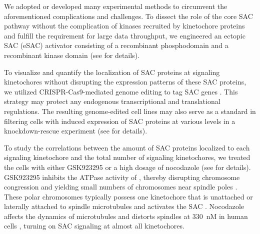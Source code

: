 We adopted or developed many experimental methods to circumvent the aforementioned complications and challenges. To dissect the role of the core SAC pathway without the complication of kinases recruited by kinetochore proteins and fulfill the requirement for large data throughput, we engineered an ectopic SAC (eSAC) activator consisting of a recombinant  phosphodomain and a recombinant  kinase domain (see  for details).

To visualize and quantify the localization of SAC proteins at signaling kinetochores without disrupting the expression patterns of these SAC proteins, we utilized CRISPR-Cas9-mediated genome editing to tag SAC genes  \cite{HDRTiming}. This strategy may protect any endogenous transcriptional and translational regulations. The resulting genome-edited cell lines may also serve as a standard in filtering cells with induced expression of SAC proteins at various levels in a knockdown-rescue experiment (see  for details).

To study the correlations between the amount of SAC proteins localized to each signaling kinetochore and the total number of signaling kinetochores, we treated the cells with either GSK923295 or a high dosage of nocodazole (see  for details). GSK923295 inhibits the ATPase activity of , thereby disrupting chromosome congression and yielding small numbers of chromosomes near spindle poles \cite{GSK923295}. These polar chromosomes typically possess one kinetochore that is unattached or laterally attached to spindle microtubules and activates the SAC \cite{GSK923295MonastrolCotreatment, GSK923295LateralAttachmentEM, LateralAttachmentSAC}. Nocodazole affects the dynamics of microtubules and distorts spindles at \SI{330}{nM} in human cells \cite{TypeIIISpindle_330nMNoc, RPE1+Noc}, turning on SAC signaling at almost all kinetochores.
